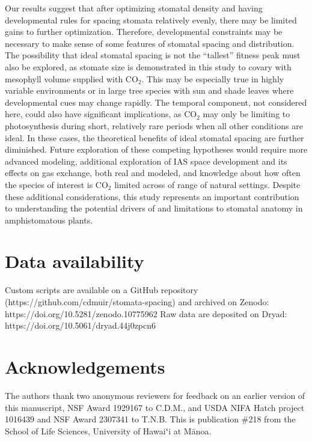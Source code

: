 \documentclass[webpdf,large,modern,unnumsec,namedate]{oup-authoring-template}
\begin{document}
Our results suggest that after optimizing stomatal density and having
developmental rules for spacing stomata relatively evenly, there may be
limited gains to further optimization. Therefore, developmental
constraints may be necessary to make sense of some features of stomatal
spacing and distribution. The possibility that ideal stomatal spacing is
not the ``tallest'' fitness peak must also be explored, as stomate size
is demonstrated in this study to covary with mesophyll volume supplied
with CO\(_2\). This may be especially true in highly variable
environments or in large tree species with sun and shade leaves where
developmental cues may change rapidly. The temporal component, not
considered here, could also have significant implications, as CO\(_2\)
may only be limiting to photosynthesis during short, relatively rare
periods when all other conditions are ideal. In these cases, the
theoretical benefits of ideal stomatal spacing are further diminished.
Future exploration of these competing hypotheses would require more
advanced modeling, additional exploration of IAS space development and
its effects on gas exchange, both real and modeled, and knowledge about
how often the species of interest is CO\(_2\) limited across of range of
natural settings. Despite these additional considerations, this study
represents an important contribution to understanding the potential
drivers of and limitations to stomatal anatomy in amphistomatous plants.

\section{Data availability}\label{data-availability}

Custom scripts are available on a GitHub repository
(https://github.com/cdmuir/stomata-spacing) and archived on Zenodo:
https://doi.org/10.5281/zenodo.10775962 Raw data are deposited on Dryad:
https://doi.org/10.5061/dryad.44j0zpcn6

\section{Acknowledgements}\label{acknowledgements}

The authors thank two anonymous reviewers for feedback on an earlier
version of this manuscript, NSF Award 1929167 to C.D.M., and USDA NIFA
Hatch project 1016439 and NSF Award 2307341 to T.N.B. This is
publication \#218 from the School of Life Sciences, University of
Hawaiʻi at Mānoa.
\end{document}
